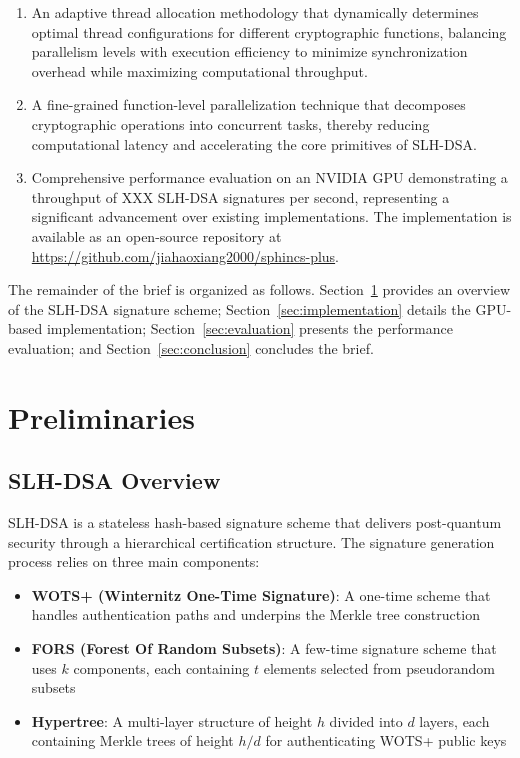 \documentclass[journal]{IEEEtran}
\begin{document}
\begin{enumerate}
  \item An adaptive thread allocation methodology that dynamically determines optimal thread configurations for different cryptographic functions, balancing parallelism levels with execution efficiency to minimize synchronization overhead while maximizing computational throughput.

  \item A fine-grained function-level parallelization technique that decomposes cryptographic operations into concurrent tasks, thereby reducing computational latency and accelerating the core primitives of SLH-DSA.

  \item Comprehensive performance evaluation on an NVIDIA GPU demonstrating a throughput of XXX SLH-DSA signatures per second, representing a significant advancement over existing implementations. The implementation is available as an open-source repository at \url{https://github.com/jiahaoxiang2000/sphincs-plus}.
\end{enumerate}

The remainder of the brief is organized as follows. Section~\ref{sec:preliminaries} provides an overview of the SLH-DSA signature scheme; Section~\ref{sec:implementation} details the GPU-based implementation; Section~\ref{sec:evaluation} presents the performance evaluation; and Section~\ref{sec:conclusion} concludes the brief.

\section{Preliminaries}\label{sec:preliminaries}

\subsection{SLH-DSA Overview}

SLH-DSA is a stateless hash-based signature scheme that delivers post-quantum security through a hierarchical certification structure. The signature generation process relies on three main components:

\begin{itemize}
  \item \textbf{WOTS+ (Winternitz One-Time Signature)}: A one-time scheme that handles authentication paths and underpins the Merkle tree construction
  \item \textbf{FORS (Forest Of Random Subsets)}: A few-time signature scheme that uses $k$ components, each containing $t$ elements selected from pseudorandom subsets
  \item \textbf{Hypertree}: A multi-layer structure of height $h$ divided into $d$ layers, each containing Merkle trees of height $h/d$ for authenticating WOTS+ public keys
\end{itemize}
\end{document}
